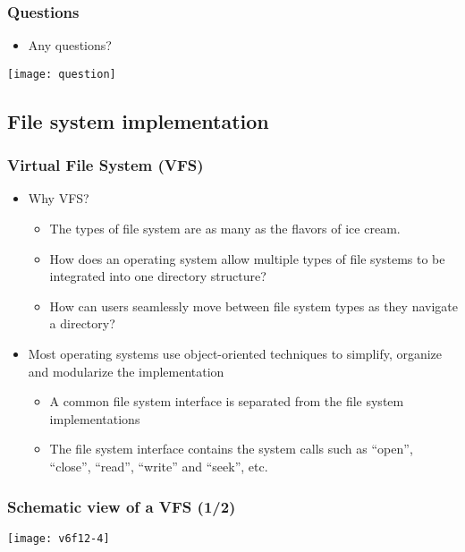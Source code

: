 \documentclass[CJKutf8,xcolor=pdftex,dvipsnames,table]{beamer}
\begin{document}
\begin{CJK*}{UTF8}{song}
  \begin{frame}
    \frametitle{Questions}
    \begin{itemize}
    \item Any questions?
    \end{itemize}
    \begin{center}
      \texttt{[image: question]}
    \end{center}
  \end{frame}
  
  \subsection{File system implementation}

  \begin{frame}
    \frametitle{Virtual File System (VFS)} \pause
    \begin{itemize}\parskip=0pt
    \item Why VFS? \pause
      \begin{itemize}\parskip=0pt
      \item The types of file system are as many as the flavors of ice cream. \pause
      \item How does an operating system allow multiple types of file systems to be integrated into one directory structure? \pause
      \item How can users seamlessly move between file system types as they navigate a directory? \pause
      \end{itemize}
    \item Most operating systems use object-oriented techniques to simplify, organize and modularize the implementation \pause
      \begin{itemize}\parskip=0pt
      \item A common file system interface is separated from the file system implementations \pause
      \item The file system interface contains the system calls such as ``open'', ``close'', ``read'', ``write'' and ``seek'', etc.
      \end{itemize}
    \end{itemize}
  \end{frame}
  
  \begin{frame}
    \frametitle{Schematic view of a VFS (1/2)} \pause
    \begin{center}
      \texttt{[image: v6f12-4]}
    \end{center}
  \end{frame}
  

\end{CJK*}
\end{document}
